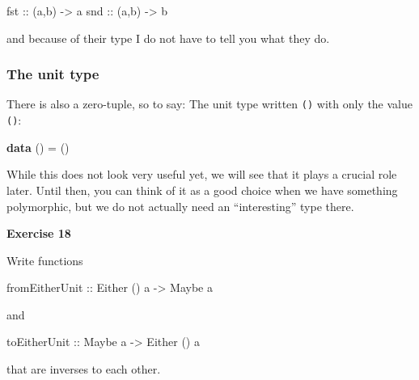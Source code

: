 \documentclass[11pt,
  american,
  DIV13]{article}
\newenvironment{Shaded}{}{}
\newcommand{\DataTypeTok}[1]{\textcolor[rgb]{0.56,0.13,0.00}{#1}}
\newcommand{\FunctionTok}[1]{\textcolor[rgb]{0.02,0.16,0.49}{#1}}
\newcommand{\KeywordTok}[1]{\textcolor[rgb]{0.00,0.44,0.13}{\textbf{#1}}}
\newcommand{\NormalTok}[1]{#1}
\newcommand{\OtherTok}[1]{\textcolor[rgb]{0.00,0.44,0.13}{#1}}
\begin{document}
\begin{Shaded}
\begin{Highlighting}[]
\FunctionTok{fst}\OtherTok{ ::}\NormalTok{ (a,b) }\OtherTok{{-}\textgreater{}}\NormalTok{ a}
\FunctionTok{snd}\OtherTok{ ::}\NormalTok{ (a,b) }\OtherTok{{-}\textgreater{}}\NormalTok{ b}
\end{Highlighting}
\end{Shaded}

and because of their type I do not have to tell you what they do.

\hypertarget{the-unit-type}{%
\subsubsection{The unit type}\label{the-unit-type}}

There is also a zero-tuple, so to say: The unit type written \texttt{()}
with only the value \texttt{()}:

\begin{Shaded}
\begin{Highlighting}[]
\KeywordTok{data}\NormalTok{ () }\OtherTok{=}\NormalTok{ ()}
\end{Highlighting}
\end{Shaded}

While this does not look very useful yet, we will see that it plays a
crucial role later. Until then, you can think of it as a good choice
when we have something polymorphic, but we do not actually need an
``interesting'' type there.

\textbf{Exercise 18}

Write functions

\begin{Shaded}
\begin{Highlighting}[]
\OtherTok{fromEitherUnit ::} \DataTypeTok{Either}\NormalTok{ () a }\OtherTok{{-}\textgreater{}} \DataTypeTok{Maybe}\NormalTok{ a}
\end{Highlighting}
\end{Shaded}

and

\begin{Shaded}
\begin{Highlighting}[]
\OtherTok{toEitherUnit ::} \DataTypeTok{Maybe}\NormalTok{ a }\OtherTok{{-}\textgreater{}} \DataTypeTok{Either}\NormalTok{ () a}
\end{Highlighting}
\end{Shaded}

that are inverses to each other.
\end{document}
